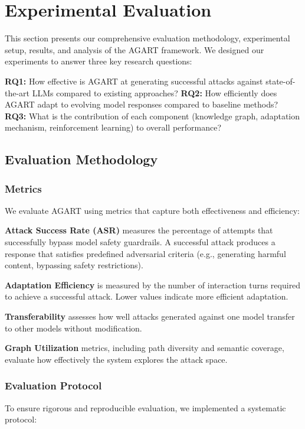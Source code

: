 \section{Experimental Evaluation}

This section presents our comprehensive evaluation methodology, experimental setup, results, and analysis of the AGART framework. We designed our experiments to answer three key research questions:

\textbf{RQ1:} How effective is AGART at generating successful attacks against state-of-the-art LLMs compared to existing approaches?
\textbf{RQ2:} How efficiently does AGART adapt to evolving model responses compared to baseline methods?
\textbf{RQ3:} What is the contribution of each component (knowledge graph, adaptation mechanism, reinforcement learning) to overall performance?

\subsection{Evaluation Methodology}

\subsubsection{Metrics}
We evaluate AGART using metrics that capture both effectiveness and efficiency:

\textbf{Attack Success Rate (ASR)} measures the percentage of attempts that successfully bypass model safety guardrails. A successful attack produces a response that satisfies predefined adversarial criteria (e.g., generating harmful content, bypassing safety restrictions).

\textbf{Adaptation Efficiency} is measured by the number of interaction turns required to achieve a successful attack. Lower values indicate more efficient adaptation.

\textbf{Transferability} assesses how well attacks generated against one model transfer to other models without modification.

\textbf{Graph Utilization} metrics, including path diversity and semantic coverage, evaluate how effectively the system explores the attack space.

\subsubsection{Evaluation Protocol}
To ensure rigorous and reproducible evaluation, we implemented a systematic protocol:

